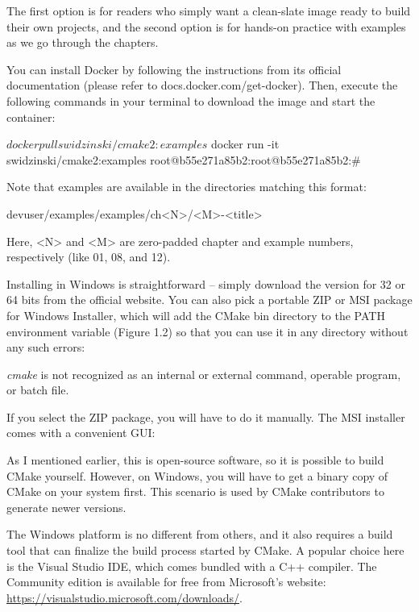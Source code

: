 The first option is for readers who simply want a clean-slate image ready to build their own projects, and the second option is for hands-on practice with examples as we go through the chapters.

You can install Docker by following the instructions from its official documentation (please refer to docs.docker.com/get-docker). Then, execute the following commands in your terminal to download the image and start the container:

\begin{shell}
$ docker pull swidzinski/cmake2:examples
$ docker run -it swidzinski/cmake2:examples
root@b55e271a85b2:root@b55e271a85b2:#
\end{shell}

Note that examples are available in the directories matching this format:

\begin{shell}
devuser/examples/examples/ch<N>/<M>-<title>
\end{shell}

Here, <N> and <M> are zero-padded chapter and example numbers, respectively (like 01, 08, and 12).


Installing in Windows is straightforward – simply download the version for 32 or 64 bits from the official website. You can also pick a portable ZIP or MSI package for Windows Installer, which will add the CMake bin directory to the PATH environment variable (Figure 1.2) so that you can use it in any directory without any such errors:

\textit{cmake} is not recognized as an internal or external command, operable program, or batch file.

If you select the ZIP package, you will have to do it manually. The MSI installer comes with a convenient GUI:


As I mentioned earlier, this is open-source software, so it is possible to build CMake yourself. However, on Windows, you will have to get a binary copy of CMake on your system first. This scenario is used by CMake contributors to generate newer versions.

The Windows platform is no different from others, and it also requires a build tool that can finalize the build process started by CMake. A popular choice here is the Visual Studio IDE, which comes bundled with a C++ compiler. The Community edition is available for free from Microsoft’s website: \url{https://visualstudio.microsoft.com/downloads/}.


